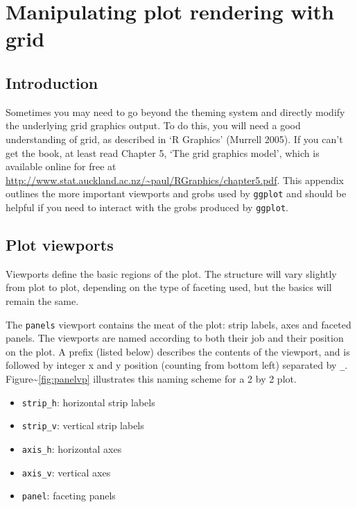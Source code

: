 \chapter{Manipulating plot rendering with grid}\label{cha:grid}

\section{Introduction}

Sometimes you may need to go beyond the theming system and directly
modify the underlying grid graphics output. To do this, you will need a
good understanding of grid, as described in `R Graphics' (Murrell 2005).
If you can't get the book, at least read Chapter 5, `The grid graphics
model', which is available online for free at
\url{http://www.stat.auckland.ac.nz/~paul/RGraphics/chapter5.pdf}. This
appendix outlines the more important viewports and grobs used by
\texttt{ggplot} and should be helpful if you need to interact with the
grobs produced by \texttt{ggplot}.  

\section{Plot viewports}\label{sec:plot-viewports}

Viewports define the basic regions of the plot. The structure will vary
slightly from plot to plot, depending on the type of faceting used, but
the basics will remain the same. 

The \texttt{panels} viewport contains the meat of the plot: strip
labels, axes and faceted panels. The viewports are named according to
both their job and their position on the plot. A prefix (listed below)
describes the contents of the viewport, and is followed by integer x and
y position (counting from bottom left) separated by \texttt{\_}.
Figure\textasciitilde{}\ref{fig:panelvp} illustrates this naming scheme
for a 2 by 2 plot.

\begin{itemize}
\itemsep1pt\parskip0pt
\item
  \texttt{strip\_h}: horizontal strip labels
\item
  \texttt{strip\_v}: vertical strip labels
\item
  \texttt{axis\_h}: horizontal axes
\item
  \texttt{axis\_v}: vertical axes
\item
  \texttt{panel}: faceting panels
\end{itemize}

